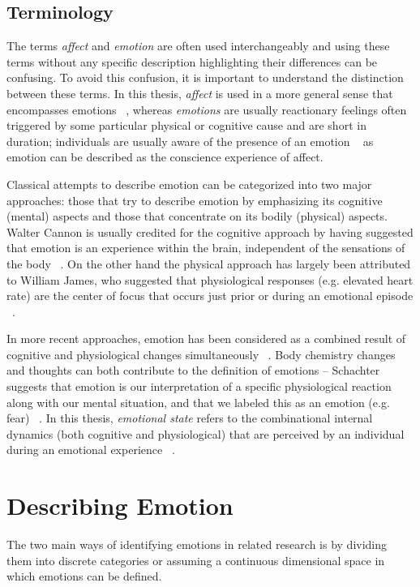 \subsection{Terminology}
The terms \textit{affect} and \textit{emotion} are often used interchangeably and using these terms without any specific description highlighting their differences can be confusing. To avoid this confusion, it is important to understand the distinction between these terms. In this thesis, \textit{affect} is used in a more general sense that encompasses emotions ~\cite{forgas1995mood}, whereas \textit{emotions} are usually reactionary feelings often triggered by some particular physical or cognitive cause and are short in duration; individuals are usually aware of the presence of an emotion ~\cite{paiva2007affective} as emotion can be described as the conscience experience of affect.

Classical attempts to describe emotion can be categorized into two major approaches: those that try to describe emotion by emphasizing its cognitive (mental) aspects and those that concentrate on its bodily (physical) aspects. Walter Cannon is usually credited for the cognitive approach by having suggested that emotion is an experience within the brain, independent of the sensations of the body ~\cite{cannon1927james}. On the other hand the physical approach has largely been attributed to William James, who suggested that physiological responses (e.g. elevated heart rate) are the center of focus that occurs just prior or during an emotional episode ~\cite{paiva2007affective}.

In more recent approaches, emotion has been considered as a combined result of cognitive and physiological changes simultaneously ~\cite{paiva2007affective}. Body chemistry changes and thoughts can both contribute to the definition of emotions – Schachter suggests that emotion is our interpretation of a specific physiological reaction along with our mental situation, and that we labeled this as an emotion (e.g. fear) ~\cite{schachter1964interaction}. In this thesis, \textit{emotional state} refers to the combinational internal dynamics (both cognitive and physiological) that are perceived by an individual during an emotional experience ~\cite{paiva2007affective}.

\section{Describing Emotion}

The two main ways of identifying emotions in related research is by dividing them into discrete categories or assuming a continuous dimensional space in which emotions can be defined.

